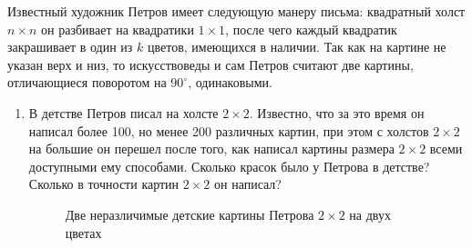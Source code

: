 Известный художник Петров имеет следующую манеру письма: квадратный холст $n\times n$ он разбивает на квадратики $1\times 1$, после чего каждый квадратик закрашивает в один из $k$ цветов, имеющихся в наличии. Так как на картине не указан верх и низ, то искусствоведы и сам Петров считают две картины, отличающиеся поворотом на $90^{\circ}$, одинаковыми.
\begin{enumerate}
\item В детстве Петров писал на холсте $2\times 2$. Известно, что за это время он написал более 100, но менее 200 различных картин, при этом с холстов $2\times 2$ на большие он перешел после того, как написал картины размера $2\times 2$ всеми доступными ему способами. Сколько красок было у Петрова в детстве? Сколько в точности картин $2\times 2$ он написал?

\begin{figure}[ht]
\begin{center}
\end{center}
\caption{Две неразличимые детские картины Петрова $2\times 2$ на двух цветах}
\end{figure}


\end{enumerate}
